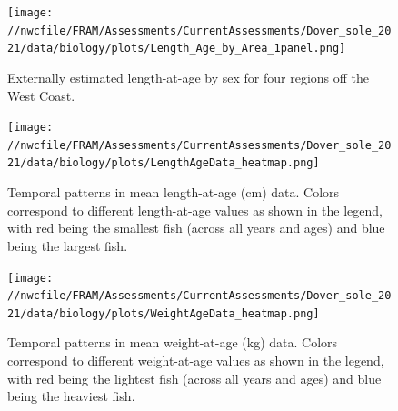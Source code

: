 \documentclass[11pt,
  english,
  a4paper,
]{article}
\begin{document}
\tagmcend\tagstructend


\begin{figure}
\centering
\texttt{[image: //nwcfile/FRAM/Assessments/CurrentAssessments/Dover\_sole\_2021/data/biology/plots/Length\_Age\_by\_Area\_1panel.png]}
\caption{Externally estimated length-at-age by sex for four regions off the West Coast.\label{fig:est-len-at-age-region}}
\end{figure}

\tagmcend\tagstructend


\begin{figure}
\centering
\texttt{[image: //nwcfile/FRAM/Assessments/CurrentAssessments/Dover\_sole\_2021/data/biology/plots/LengthAgeData\_heatmap.png]}
\caption{Temporal patterns in mean length-at-age (cm) data. Colors correspond to different length-at-age values as shown in the legend, with red being the smallest fish (across all years and ages) and blue being the largest fish.\label{fig:tv-len-at-age}}
\end{figure}

\tagmcend\tagstructend


\begin{figure}
\centering
\texttt{[image: //nwcfile/FRAM/Assessments/CurrentAssessments/Dover\_sole\_2021/data/biology/plots/WeightAgeData\_heatmap.png]}
\caption{Temporal patterns in mean weight-at-age (kg) data. Colors correspond to different weight-at-age values as shown in the legend, with red being the lightest fish (across all years and ages) and blue being the heaviest fish.\label{fig:tv-wght-at-age}}
\end{figure}

\tagmcend\tagstructend

\end{document}
